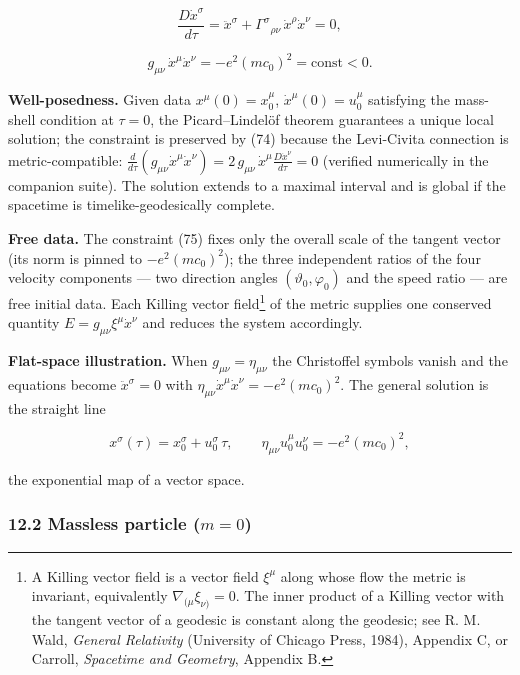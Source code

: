 \documentclass[
]{article}
\begin{document}
\[\frac{D \dot{x}^{\sigma}}{d\tau} = \ddot{x}^{\sigma} + \Gamma^{\sigma}{}_{\rho\nu}\, \dot{x}^{\rho} \dot{x}^{\nu} = 0, \tag{74}\]

\[g_{\mu\nu}\, \dot{x}^{\mu} \dot{x}^{\nu} = - e^{2}(mc_{0})^{2} = \mathrm{const} < 0. \tag{75}\]

\textbf{Well-posedness.} Given data \(x^{\mu}(0) = x^{\mu}_{0}\),
\(\dot{x}^{\mu}(0) = u^{\mu}_{0}\) satisfying the mass-shell condition
at \(\tau = 0\), the Picard--Lindelöf theorem guarantees a unique local
solution; the constraint is preserved by (74) because the Levi-Civita
connection is metric-compatible:
\(\frac{d}{d\tau}\left(g_{\mu\nu}\dot{x}^{\mu}\dot{x}^{\nu}\right) = 2\, g_{\mu\nu}\, \dot{x}^{\mu} \frac{D\dot{x}^{\nu}}{d\tau} = 0\)
(verified numerically in the companion suite). The solution extends to a
maximal interval and is global if the spacetime is timelike-geodesically
complete.

\textbf{Free data.} The constraint (75) fixes only the overall scale of
the tangent vector (its norm is pinned to \(-e^{2}(mc_{0})^{2}\)); the
three independent ratios of the four velocity components --- two
direction angles \((\vartheta_{0}, \varphi_{0})\) and the speed ratio
--- are free initial data. Each Killing vector field\footnote{A Killing
  vector field is a vector field \(\xi^{\mu}\) along whose flow the
  metric is invariant, equivalently \(\nabla_{(\mu} \xi_{\nu)} = 0\).
  The inner product of a Killing vector with the tangent vector of a
  geodesic is constant along the geodesic; see R. M. Wald, \emph{General
  Relativity} (University of Chicago Press, 1984), Appendix C, or
  Carroll, \emph{Spacetime and Geometry}, Appendix B.} of the metric
supplies one conserved quantity
\(E = g_{\mu\nu} \xi^{\mu} \dot{x}^{\nu}\) and reduces the system
accordingly.

\textbf{Flat-space illustration.} When \(g_{\mu\nu} = \eta_{\mu\nu}\)
the Christoffel symbols vanish and the equations become
\(\ddot{x}^{\sigma} = 0\) with
\(\eta_{\mu\nu} \dot{x}^{\mu} \dot{x}^{\nu} = -e^{2}(mc_{0})^{2}\). The
general solution is the straight line

\[x^{\sigma}(\tau) = x^{\sigma}_{0} + u^{\sigma}_{0}\, \tau, \qquad \eta_{\mu\nu} u^{\mu}_{0} u^{\nu}_{0} = - e^{2} (mc_{0})^{2}, \tag{76}\]

the exponential map of a vector space.

\hypertarget{massless-particle-m-0}{%
\subsubsection{\texorpdfstring{12.2 Massless particle
(\(m = 0\))}{12.2 Massless particle (m = 0)}}\label{massless-particle-m-0}}
\end{document}
